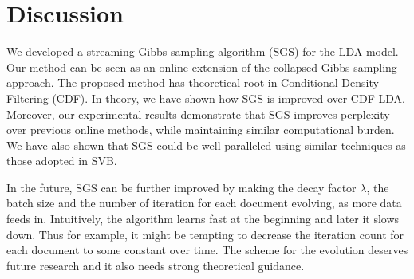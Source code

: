 \documentclass{article} %
\begin{document}
\section{Discussion}
We developed a streaming Gibbs sampling algorithm (SGS) for the LDA model. Our method can be seen as an online extension of the collapsed Gibbs sampling approach. The proposed method has theoretical root in Conditional Density Filtering (CDF). In theory, we have shown how SGS is improved over CDF-LDA. Moreover, our experimental results demonstrate that SGS improves perplexity over previous online methods, while maintaining similar computational burden. We have also shown that SGS could be well paralleled using similar techniques as those adopted in SVB. 

In the future, SGS can be further improved by making the decay factor $\lambda$, the batch size and the number of iteration for each document evolving, as more data feeds in. Intuitively, the algorithm learns fast at the beginning and later it slows down. Thus for example, it might be tempting to decrease the iteration count for each document to some constant over time. The scheme for the evolution deserves future research and it also needs strong theoretical guidance. 




\end{document}
